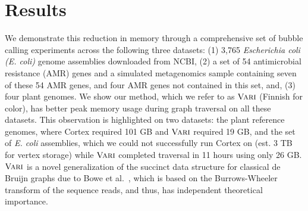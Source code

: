 \section{Results}
We demonstrate this reduction in memory through a comprehensive set of bubble calling experiments across the following three datasets: (1) 3,765 {\em Escherichia coli (E. coli)} genome assemblies downloaded from NCBI, (2) a set of 54 antimicrobial resistance (AMR) genes and a simulated metagenomics sample containing seven of these 54 AMR genes, and four AMR genes not contained in this set, and, (3) four plant genomes.  We show our method, which we refer to as $\mbox{\rm {\sc Vari}}$ (Finnish for color), has better peak memory usage during graph traversal on all these datasets.  This observation is highlighted on two datasets: the plant reference genomes, where {\sc Cortex} required 101 GB and $\mbox{\rm {\sc Vari}}$ required 19 GB, and the set of \emph{E. coli} assemblies, which we could not successfully run {\sc Cortex} on (est. 3 TB for vertex storage) while $\mbox{\rm {\sc Vari}}$ completed traversal in 11 hours using only 26 GB. $\mbox{\rm {\sc Vari}}$ is a novel generalization of the succinct data structure for classical de Bruijn graphs due to Bowe et al.~\cite{BOSS12}, which is based on the Burrows-Wheeler transform of the sequence reads, and thus, has independent theoretical importance.

 


 
 
